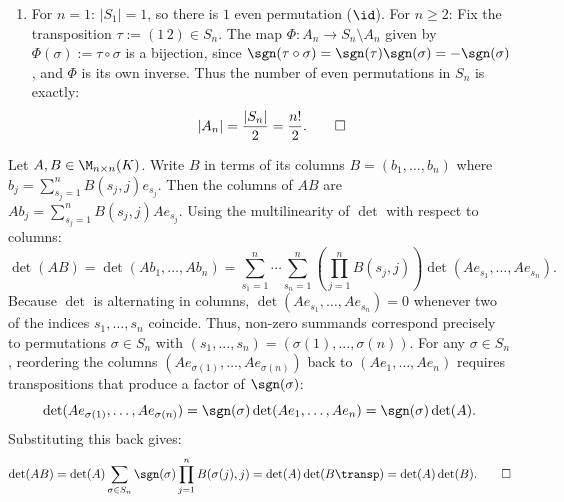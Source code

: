 \begin{exercisesolution*}
\begin{enumerate}[label=\textbf{(\alph*)}]
    \item For $n = 1$: $|S_1| = 1$, so there is $1$ even permutation ($\id$).
    For $n \ge 2$: Fix the transposition $\tau := (1\,2) \in S_n$.
    The map $\Phi \colon A_n \to S_n \setminus A_n$ given by $\Phi(\sigma) := \tau \circ \sigma$ is a bijection, since $\sgn(\tau \circ \sigma) = \sgn(\tau) \sgn(\sigma) = -\sgn(\sigma)$, and $\Phi$ is its own inverse.
    Thus the number of even permutations in $S_n$ is exactly:
    \[
    |A_n| = \frac{|S_n|}{2} = \frac{n!}{2}. \qedhere
    \]
\end{enumerate}
\end{exercisesolution*}

\begin{exercisesolution}
\label{sol:multiplicativity_via_leibniz}
Let $A, B \in \M_{n \times n}(K)$. Write $B$ in terms of its columns $B = (b_1, \dots, b_n)$ where $b_j = \sum_{s_j=1}^n B(s_j, j) e_{s_j}$.
Then the columns of $AB$ are $A b_j = \sum_{s_j=1}^n B(s_j, j) A e_{s_j}$.
Using the multilinearity of $\det$ with respect to columns:
\[
\det(AB) = \det(A b_1, \dots, A b_n) = \sum_{s_1=1}^n \cdots \sum_{s_n=1}^n \left(\prod_{j=1}^n B(s_j, j)\right) \det(A e_{s_1}, \dots, A e_{s_n}).
\]
Because $\det$ is alternating in columns, $\det(A e_{s_1}, \dots, A e_{s_n}) = 0$ whenever two of the indices $s_1, \dots, s_n$ coincide.
Thus, non-zero summands correspond precisely to permutations $\sigma \in S_n$ with $(s_1, \dots, s_n) = (\sigma(1), \dots, \sigma(n))$.
For any $\sigma \in S_n$, reordering the columns $(A e_{\sigma(1)}, \dots, A e_{\sigma(n)})$ back to $(A e_1, \dots, A e_n)$ requires transpositions that produce a factor of $\sgn(\sigma)$:
\[
\det(A e_{\sigma(1)}, \dots, A e_{\sigma(n)}) = \sgn(\sigma) \det(A e_1, \dots, A e_n) = \sgn(\sigma) \det(A).
\]
Substituting this back gives:
\[
\det(AB) = \det(A) \sum_{\sigma \in S_n} \sgn(\sigma) \prod_{j=1}^n B(\sigma(j), j) = \det(A) \det(B\transp) = \det(A) \det(B). \qedhere
\]
\end{exercisesolution}

